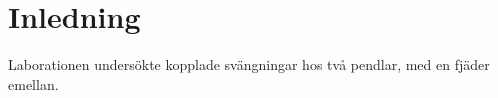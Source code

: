 \section{Inledning}
Laborationen undersökte kopplade svängningar hos två pendlar, med en fjäder emellan.